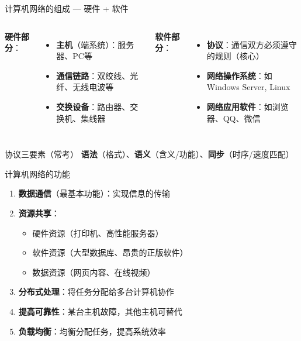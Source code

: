 \documentclass[10pt, aspectratio=169]{beamer}
\begin{document}
\begin{frame}{计算机网络的组成 --- 硬件 + 软件}
    \begin{columns}[T]
        \textbf{硬件部分}：
        \begin{itemize}
            \item \textbf{主机}（端系统）：服务器、PC等
            \item \textbf{通信链路}：双绞线、光纤、无线电波等
            \item \textbf{交换设备}：路由器、交换机、集线器
        \end{itemize}
        \textbf{软件部分}：
        \begin{itemize}
            \item \textbf{协议}：通信双方必须遵守的规则（核心）
            \item \textbf{网络操作系统}：如Windows Server, Linux
            \item \textbf{网络应用软件}：如浏览器、QQ、微信
        \end{itemize}
    \end{columns}
    \vspace{0.5em}
    \begin{block}{协议三要素（常考）}
        \textbf{语法}（格式）、\textbf{语义}（含义/功能）、\textbf{同步}（时序/速度匹配）
    \end{block}
\end{frame}

\begin{frame}{计算机网络的功能}
    \begin{enumerate}
        \item \textbf{数据通信}（最基本功能）：实现信息的传输
        \item \textbf{资源共享}：
        \begin{itemize}
            \item 硬件资源（打印机、高性能服务器）
            \item 软件资源（大型数据库、昂贵的正版软件）
            \item 数据资源（网页内容、在线视频）
        \end{itemize}
        \item \textbf{分布式处理}：将任务分配给多台计算机协作
        \item \textbf{提高可靠性}：某台主机故障，其他主机可替代
        \item \textbf{负载均衡}：均衡分配任务，提高系统效率
    \end{enumerate}
\end{frame}
\end{document}
